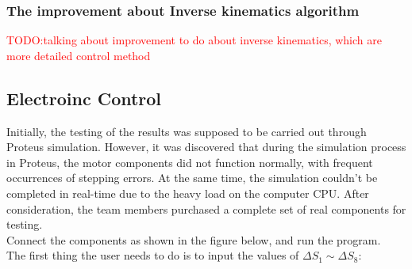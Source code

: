 \subsubsection{The improvement about Inverse kinematics algorithm}
\textcolor{red}{TODO:talking about improvement to do about inverse kinematics, which are more detailed control method}

\subsection{Electroinc Control}
Initially, the testing of the results was supposed to be carried out through Proteus simulation. However, 
it was discovered that during the simulation process in Proteus, the motor components did not function normally, 
with frequent occurrences of stepping errors. At the same time, the simulation couldn't be completed in real-time 
due to the heavy load on the computer CPU. After consideration, the team members purchased a complete set of real 
components for testing. \\
Connect the components as shown in the figure below, and run the program. \\
The first thing the user needs to do is to input the values of $\Delta S_1 \sim \Delta S_8$: \\

